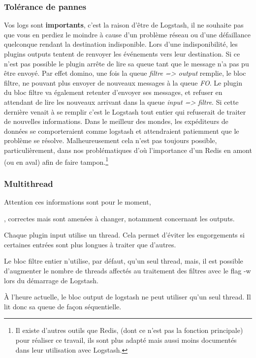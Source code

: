 \subsubsection{Tolérance de pannes}
Vos logs sont \textbf{importants}, c'est la raison d'être de Logstash, il ne souhaite 
pas que vous en perdiez le moindre à cause d'un problème réseau ou d'une défaillance
quelconque rendant la destination indisponible.
Lors d'une indisponibilité, les plugins outputs tentent de renvoyer les événements 
vers leur destination. Si ce n'est pas possible le plugin arrête de lire sa queue 
tant que le message n'a pas pu être envoyé. Par effet domino, une fois la queue 
\textit{filtre => output} remplie, le bloc filtre, ne pouvant plus envoyer de nouveaux 
messages à la queue \textit{FO}. Le plugin du bloc filtre va également retenter 
d'envoyer ses messages, et refuser en attendant de lire les nouveaux arrivant dans 
la queue \textit{input => filtre}.
Si cette dernière venait à se remplir c'est le Logstash tout entier qui refuserait de 
traiter de nouvelles informations. Dans le meilleur des mondes, les expéditeurs de
données se comporteraient comme logstash et attendraient patiemment que le problème
se résolve. Malheureusement cela n'est pas toujours possible, particulièrement, dans
nos problématiques d'où l'importance d'un Redis en amont (ou en aval) afin de 
faire tampon.\footnote{Il existe d'autres outils que Redis, (dont ce n'est pas la fonction
principale) pour réaliser ce travail, ils sont plus adapté mais aussi moins documentés
dans leur utilisation avec Logstash.}

\subsubsection{Multithread}
Attention ces informations sont pour le moment, \date{Jeudi 16 Avril}, correctes 
mais sont amenées à changer, notamment concernant les outputs.

Chaque plugin input utilise un \gls{thread}. Cela permet d'éviter les engorgements si  
certaines entrées sont plus longues à traiter que d'autres.

Le bloc filtre entier n'utilise, par défaut, qu'un seul thread, mais, il est possible 
d'augmenter le nombre de threads affectés au traitement des filtres avec le \gls{flag}
-w lors du démarrage de Logstash.

À l'heure actuelle, le bloc output de logstash ne peut utiliser qu'un seul thread.
Il lit donc sa queue de façon séquentielle.


